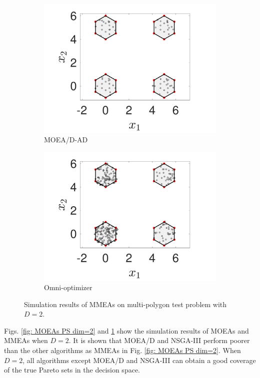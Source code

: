 \documentclass[conference]{IEEEtran}
\begin{document}
\begin{figure}[t!]
    \begin{subfigure}[b]{.24\textwidth}
    \includegraphics[width=\linewidth]{Section5/dim2/PS/MOEADAD}
    \caption{MOEA/D-AD}
    \end{subfigure}
    \begin{subfigure}[b]{.24\textwidth}
    \includegraphics[width=\linewidth]{Section5/dim2/PS/OmniOptimizer}
    \caption{Omni-optimizer}
    \end{subfigure}
    \caption{Simulation results of MMEAs on multi-polygon test problem with $D=2$.}
    \label{fig: MMEAs PS dim=2}
\end{figure}

Figs. \ref{fig: MOEAs PS dim=2} and \ref{fig: MMEAs PS dim=2} show the simulation results of MOEAs and MMEAs when $D=2$. It is shown that MOEA/D and NSGA-III perform poorer than the other algorithms as MMEAs in Fig. \ref{fig: MOEAs PS dim=2}. When $D=2$, all algorithms except MOEA/D and NSGA-III can obtain a good coverage of the true Pareto sets in the decision space.
\end{document}
